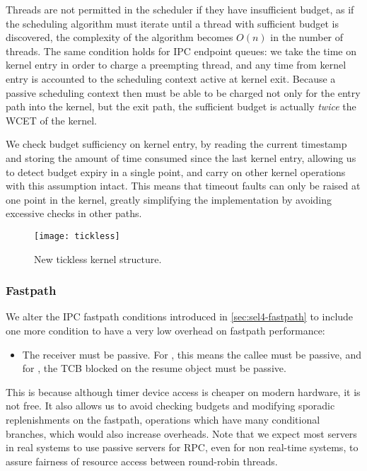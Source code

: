 Threads are not permitted in the scheduler if they have insufficient budget, as if the scheduling
algorithm must iterate until a thread with sufficient budget is discovered, the complexity of the
algorithm becomes $O(n)$ in the number of threads. The same condition holds for IPC endpoint queues:
we take the time on kernel entry in order to charge a preempting thread, and any time from kernel
entry is accounted to the scheduling context active at kernel exit. Because a passive scheduling context
then must be able to be charged not only for the entry path into the kernel, but the exit path, the
sufficient budget is actually \emph{twice} the \gls{WCET} of the kernel.

We check budget sufficiency on kernel entry, by reading the current timestamp and storing 
the amount of time consumed since the last kernel entry, allowing us to detect budget expiry in a single 
point, and carry on other kernel operations with this assumption intact. This means that timeout 
faults can only be raised at one point in the kernel, greatly simplifying the implementation by
avoiding excessive checks in other paths. 

\begin{figure}
    \centering 
    \texttt{[image: tickless]}
    \caption{New tickless kernel structure.}
    \label{figure:tickless}
\end{figure}


\subsubsection{Fastpath}
\label{p:impl-fastpath}

We alter the IPC fastpath conditions introduced in \cref{sec:sel4-fastpath} to include one
more condition to have a very low overhead on fastpath performance:
\begin{itemize}
    \item The receiver must be passive. For \call, this means the callee must be passive, and
          for \replyrecv, the TCB blocked on the resume object must be passive.
\end{itemize}
This is because
although timer device access is cheaper on modern hardware, it is not free. It also allows us to
avoid checking budgets and modifying sporadic replenishments on the fastpath, operations which have
many conditional branches, which would also increase overheads. Note that we expect most servers in
real systems to use passive servers for \gls{RPC}, even for non real-time systems, to assure
fairness of resource access between round-robin threads.  

